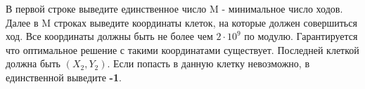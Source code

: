 В первой строке выведите единственное число M - минимальное число ходов.
Далее в M строках выведите координаты клеток, на которые должен совершиться ход. Все координаты должны быть не более чем $2 \cdot 10^9$ по модулю. Гарантируется что оптимальное решение с такими координатами существует. Последней клеткой должна быть $(X_2, Y_2)$.
Если попасть в данную клетку невозможно, в единственной выведите \textbf{-1}.